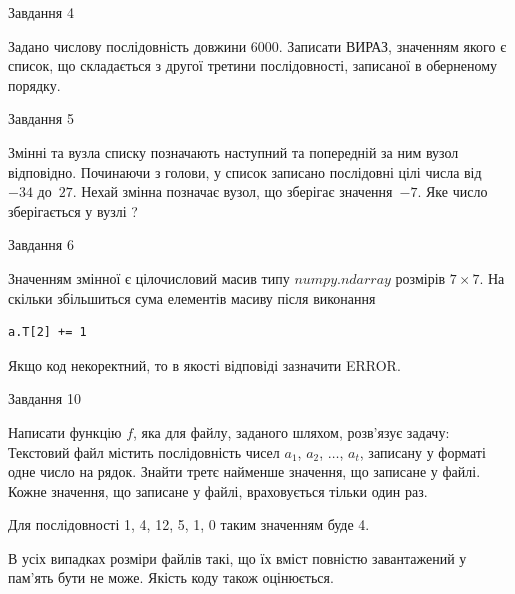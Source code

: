 \documentclass[12pt, ukrainian]{article}
\begin{document}
{               
{\begin{center}Завдання {4}\end{center}}
\vspace{-6mm}

 Задано числову послідовність  довжини 6000. Записати ВИРАЗ, значенням якого є список, що складається з другої третини послідовності, записаної в оберненому порядку.\par

\vspace{10mm}
               
{\begin{center}Завдання {5}\end{center}}
\vspace{-6mm}
Змінні  та  вузла списку позначають наступний та попередній за ним вузол відповідно. Починаючи з голови, у список записано послідовні цілі числа від~$-34$ до~$27$. Нехай змінна  позначає вузол, що зберігає значення~$-7$.
Яке число зберігається у вузлі  ?\par

               
{\begin{center}Завдання {6}\end{center}}
\vspace{-6mm}
Значенням змінної  є цілочисловий масив типу $numpy.ndarray$ розмірів $7{\times}7$. На скільки збільшиться сума елементів масиву  після виконання
\begin{verbatim}
a.T[2] += 1
\end{verbatim}


Якщо код некоректний, то в якості відповіді зазначити ERROR.\par

               
{\begin{center}Завдання {10}\end{center}}
\vspace{-6mm}

Написати функцію $f$, яка для файлу, заданого шляхом, розв’язує задачу:\\ Текстовий файл містить послідовність чисел $a_1$, $a_2$, $\ldots$, $a_t$, записану у форматі одне число на рядок. Знайти третє найменше значення, що записане у файлі. Кожне значення, що записане у файлі, враховується тільки один раз. \par
Для послідовності 1, 4, 12, 5, 1, 0 таким значенням буде 4.

В усіх випадках розміри файлів такі, що їх вміст повністю завантажений у пам'ять бути не може. Якість коду також оцінюється.



}
\end{document}
